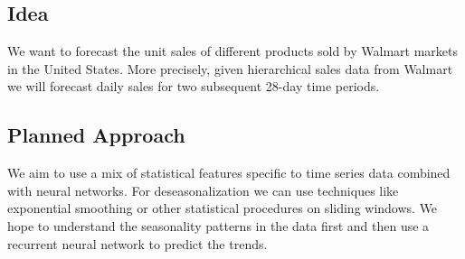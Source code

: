 \documentclass[11pt]{article}
\begin{document}
\subsection{Idea}
We want to forecast the unit sales of different products sold by Walmart markets in the United States. More precisely, given hierarchical sales data from Walmart we will forecast daily sales for two subsequent 28-day time periods.

\subsection{Planned Approach}
We aim to use a mix of statistical features specific to time series data combined with neural networks. For deseasonalization we can use techniques like exponential smoothing or other statistical procedures on sliding windows. We hope to understand the seasonality patterns in the data first and then use a recurrent neural network to predict the trends.
\end{document}
